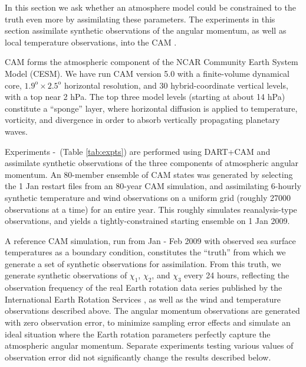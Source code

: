 In this section we ask whether an atmosphere model could be constrained to the truth even more by assimilating these parameters. 
The experiments in this section assimilate synthetic observations of the angular momentum, as well as local temperature observations, into the CAM \citep{nealeetal2010}.

CAM forms the atmospheric component of the NCAR Community Earth System Model (CESM). 
We have run CAM version 5.0 with a finite-volume dynamical core, $1.9^{\text{o}} \times 2.5^{\text{o}}$ horizontal resolution, and  30 hybrid-coordinate vertical levels, with a top near 2 hPa.
The top three model levels (starting at about 14 hPa) constitute a ``sponge'' layer, where horizontal diffusion is applied to temperature, vorticity, and divergence in order to absorb vertically propagating planetary waves.  


Experiments \NODA-\ERPRST ~(Table \ref{tab:expts}) are performed using DART+CAM and assimilate synthetic observations of the three components of atmospheric angular momentum.  
An 80-member ensemble of CAM states was generated by selecting the 1 Jan restart files from an 80-year CAM simulation, and assimilating 6-hourly synthetic temperature and wind observations on a uniform grid (roughly 27000 observations at a time) for an entire year. 
This roughly simulates reanalysis-type observations, and yields a tightly-constrained starting ensemble on 1 Jan 2009.  

A reference CAM simulation, run from Jan - Feb 2009 with observed sea surface temperatures as a boundary condition, constitutes the ``truth'' from which we generate a set of synthetic observations for assimilation. 
From this truth, we generate synthetic observations of $\chi_1$, $\chi_2$, and $\chi_3$ every 24 hours, reflecting the observation frequency of the real Earth rotation data series published by the International Earth Rotation Services \citep{iers}, as well as the wind and temperature observations described above. 
The angular momentum observations are generated with zero observation error, to minimize sampling error effects and simulate an ideal situation where the Earth rotation parameters perfectly capture the atmospheric angular momentum. 
Separate experiments testing various values of observation error did not significantly change the results described below.  

